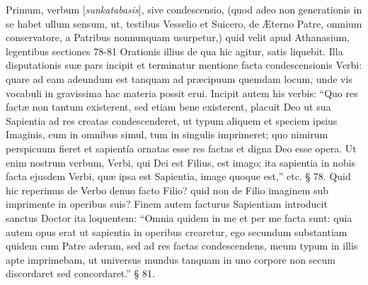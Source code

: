 Primum,
verbum [\emph{sunkatabasis}], sive condescensio, (quod adeo non
generationis in se habet ullum sensum, ut, testibus Vesselio et
Suicero, de Æterno Patre, omnium conservatore, a Patribus nonnunquam
usurpetur,) quid velit apud Athanasium, legentibus sectiones 78-81
Orationis illius de qua hic agitur, satis liquebit. Illa disputationis
suæ pars incipit et terminatur mentione facta condescensionis Verbi:
quare ad eam adeundum est tanquam ad præcipuum quemdam locum, unde
vis vocabuli in gravissima hac materia possit erui. Incipit autem his
verbis: ``Quo res factæ non tantum existerent, sed etiam bene
existerent, placuit Deo ut sua Sapientia ad res creatas condescenderet,
ut typum aliquem et speciem ipsius Imaginis, cum in omnibus simul, tum
in singulis imprimeret; quo nimirum perspicuum fieret et sapientía
ornatas esse res factas et digna Deo esse opera. Ut enim nostrum
verbum, Verbi, qui Dei est Filius, est imago; ita sapientia in nobis
facta ejusdem Verbi, quæ ipsa est Sapientia, image quoque est,''
etc. § 78. Quid hic reperimus de Verbo denuo facto Filio? quid non de
Filio imaginem sub imprimente in operibus suis? Finem autem facturus
Sapientiam introducit sanctus Doctor ita loquentem: ``Omnia quidem in
me et per me facta sunt: quia autem opus erat ut sapientia in operibus
crearetur, ego secundum substantiam quidem cum Patre aderam, sed
ad res factas condescendens, meum typum in illis apte imprimebam, ut
universus mundus tanquam in uno corpore non secum discordaret sed
concordaret.'' § 81.

